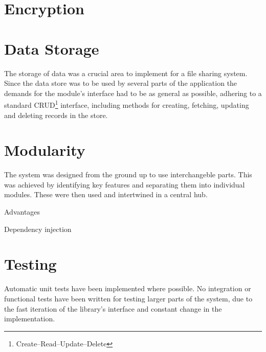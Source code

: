 
\section{Encryption}
\label{sec:cryptography}


\section{Data Storage}
\label{sec:datastorage}
The storage of data was a crucial area to implement for a file sharing system. Since the data store was to be used by several parts of the application the demands for the module's interface had to be as general as possible, adhering to a standard CRUD\footnote{Create–Read–Update–Delete} interface, including methods for creating, fetching, updating and deleting records in the store.


\section{Modularity}

The system was designed from the ground up to use interchangeble parts. This was achieved by identifying key features and separating them into individual modules. These were then used and intertwined in a central hub.

Advantages

Dependency injection

\section{Testing}
\label{sec:testing}
Automatic unit tests have been implemented where possible. No integration or functional tests have been written for testing larger parts of the system, due to the fast iteration of the library's interface and constant change in the implementation. 
